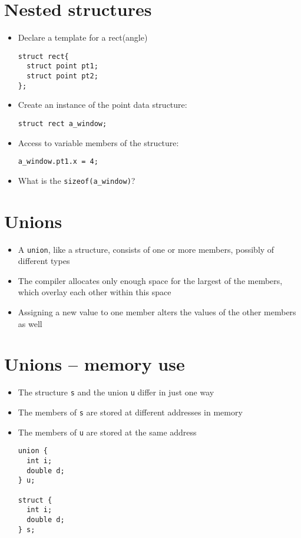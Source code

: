 \documentclass{article}
\begin{document}
\section{Nested structures}
\begin{itemize}
\item Declare a template for a rect(angle)
\begin{verbatim}
struct rect{
  struct point pt1;
  struct point pt2;
};
\end{verbatim}

\item Create an instance of the point data structure:
\begin{verbatim}
struct rect a_window;
\end{verbatim}

\item Access to variable members of the structure:
\begin{verbatim}
a_window.pt1.x = 4;
\end{verbatim}

\item What is the \verb!sizeof(a_window)!?
\end{itemize}




\section{Unions}
\begin{itemize}
\item A \verb!union!, like a structure, consists of one or more members, possibly of different types

\item The compiler allocates only enough space for the largest of the members, which overlay each other within this space

\item Assigning a new value to one member alters the values of the other members as well
\end{itemize}



\section{Unions -- memory use}
\begin{itemize}
\item The structure \verb!s! and the union \verb!u! differ in just one way
\item The members of \verb!s! are stored at different addresses in memory
\item The members of \verb!u! are stored at the same address

\begin{verbatim}
union {
  int i;
  double d;
} u;

struct {
  int i;
  double d;
} s;
\end{verbatim}
\end{itemize}
\end{document}
